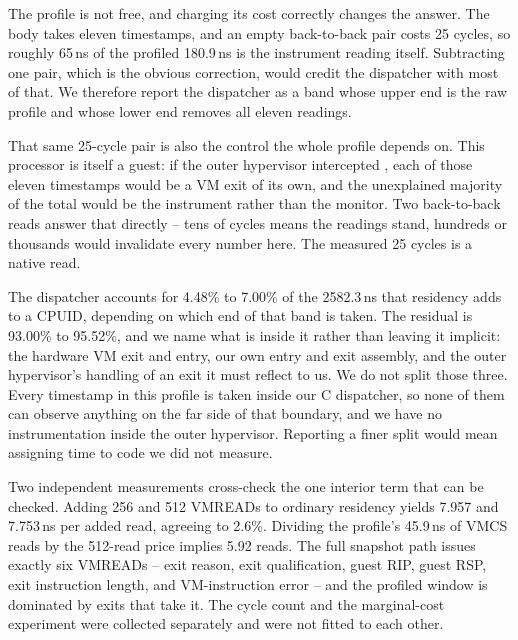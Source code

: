 The profile is not free, and charging its cost correctly changes the answer. The
body takes eleven timestamps, and an empty back-to-back pair costs 25 cycles, so
roughly 65\,ns of the profiled 180.9\,ns is the instrument reading itself.
Subtracting one pair, which is the obvious correction, would credit the
dispatcher with most of that. We therefore report the dispatcher as a band whose
upper end is the raw profile and whose lower end removes all eleven readings.

That same 25-cycle pair is also the control the whole profile depends on. This
processor is itself a guest: if the outer hypervisor intercepted ,
each of those eleven timestamps would be a VM exit of its own, and the
unexplained majority of the total would be the instrument rather than the
monitor. Two back-to-back reads answer that directly -- tens of cycles means the
readings stand, hundreds or thousands would invalidate every number here. The
measured 25 cycles is a native read.

\begin{table}[tbp]
\centering\small
\caption{Cost budget for one CPUID in nested sparse-snapshot mode. The residual
is kept as an explicit row because it is the larger term; an attribution that
omitted it would imply the dispatcher explains the overhead.}
\label{tab:attribution-budget}

\end{table}

The dispatcher accounts for 4.48\% to 7.00\% of the 2582.3\,ns that residency
adds to a CPUID, depending on which end of that band is taken. The residual is
93.00\% to 95.52\%, and we name what is inside it rather than leaving it
implicit: the hardware VM exit and entry, our own entry and exit assembly, and
the outer hypervisor's handling of an exit it must reflect to us. We do not split
those three. Every timestamp in this profile is taken inside our C dispatcher, so
none of them can observe anything on the far side of that boundary, and we have
no instrumentation inside the outer hypervisor. Reporting a finer split would
mean assigning time to code we did not measure.

Two independent measurements cross-check the one interior term that can be
checked. Adding 256 and 512 VMREADs to ordinary residency yields 7.957 and
7.753\,ns per added read, agreeing to 2.6\%. Dividing the profile's 45.9\,ns of
VMCS reads by the 512-read price implies 5.92 reads. The full snapshot path
issues exactly six VMREADs -- exit reason, exit qualification, guest RIP, guest
RSP, exit instruction length, and VM-instruction error -- and the profiled window
is dominated by exits that take it. The cycle count and the marginal-cost
experiment were collected separately and were not fitted to each other.

